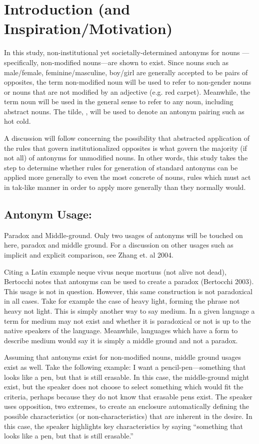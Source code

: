 \section {Introduction (and Inspiration/Motivation)}
In this study, non-institutional yet societally-determined antonyms for nouns —specifically, non-modified nouns—are shown to exist.  Since nouns such as male/female, feminine/masculine, boy/girl are generally accepted to be pairs of opposites, the term non-modified noun will be used to refer to non-gender nouns or nouns that are not modified by an adjective (e.g. red carpet).  Meanwhile, the term noun will be used in the general sense to refer to any noun, including abstract nouns.  The tilde, \oppnospace, will be used to denote an antonym pairing such as hot \opp cold.  

A discussion will follow concerning the possibility that abstracted application of the rules that govern institutionalized opposites is what govern the majority (if not all) of antonyms for unmodified nouns.  In other words, this study takes the step to determine whether rules for generation of standard antonyms can be applied more generally to even the most concrete of nouns, rules which must act in tak-like manner in order to apply more generally than they normally would.

\subsection {Antonym Usage:} Paradox and Middle-ground. Only two usages of antonyms will be touched on here, paradox and middle ground.  For a discussion on other usages such as implicit and explicit comparison, see Zhang et. al 2004.  

Citing a Latin example neque vivus neque mortuus (not alive not dead), Bertocchi notes that antonyms can be used to create a paradox (Bertocchi 2003).  This usage is not in question.  However, this same construction is not paradoxical in all cases.  Take for example the case of heavy \opp light, forming the phrase not heavy not light.  This is simply another way to say medium.  In a given language a term for medium may not exist and whether it is paradoxical or not is up to the native speakers of the language.  Meanwhile, languages which have a form to describe medium would say it is simply a middle ground and not a paradox. 

Assuming that antonyms exist for non-modified nouns, middle ground usages exist as well.  Take the following example: I want a pencil-pen—something that looks like a pen, but that is still erasable.  In this case, the middle-ground might exist, but the speaker does not choose to select something which would fit the criteria, perhaps because they do not know that erasable pens exist.  The speaker uses opposition, two extremes, to create an enclosure automatically defining the possible characteristics (or non-characteristics) that are inherent in the desire.  In this case, the speaker highlights key characteristics by saying “something that looks like a pen, but that is still erasable.”

